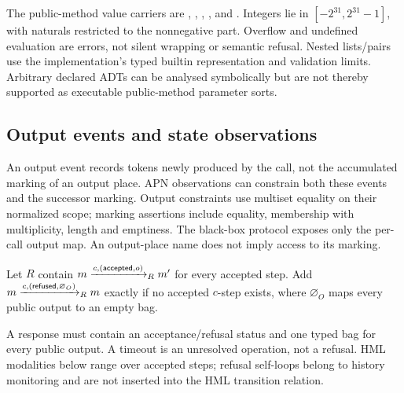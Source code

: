 The public-method value carriers are , , ,
,  and . Integers lie in
$[-2^{31},2^{31}-1]$, with naturals restricted to the nonnegative part. Overflow
and undefined evaluation are errors, not silent wrapping or semantic refusal.
Nested lists/pairs use the implementation's typed builtin representation and
validation limits. Arbitrary declared ADTs can be analysed symbolically but are
not thereby supported as executable public-method parameter sorts.

\subsection{Output events and state observations}
An output event records tokens newly produced by the call, not the accumulated
marking of an output place. APN observations can constrain both these events and
the successor marking. Output constraints use multiset equality on their normalized
scope; marking assertions include equality, membership with multiplicity, length
and emptiness. The black-box protocol exposes only the per-call output map. An
output-place name does not imply access to its marking.

\begin{definition}
Let $R$ contain $m\xrightarrow{c,(\mathsf{accepted},o)}_R m'$ for every accepted step.
Add $m\xrightarrow{c,(\mathsf{refused},\varnothing_O)}_R m$ exactly if no accepted
$c$-step exists, where $\varnothing_O$ maps every public output to an empty bag.
\end{definition}
A response must contain an acceptance/refusal status and one typed bag for every
public output. A timeout is an unresolved operation, not a refusal. HML modalities
below range over accepted steps; refusal self-loops belong to history monitoring
and are not inserted into the HML transition relation.
